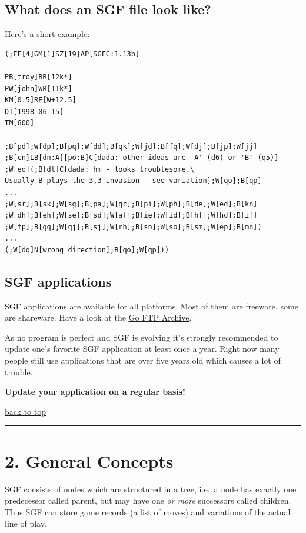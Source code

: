 \subsection{What does an SGF file look
like?}\label{what-does-an-sgf-file-look-like}

Here's a short example:

\begin{verbatim}
(;FF[4]GM[1]SZ[19]AP[SGFC:1.13b]

PB[troy]BR[12k*]
PW[john]WR[11k*]
KM[0.5]RE[W+12.5]
DT[1998-06-15]
TM[600]

;B[pd];W[dp];B[pq];W[dd];B[qk];W[jd];B[fq];W[dj];B[jp];W[jj]
;B[cn]LB[dn:A][po:B]C[dada: other ideas are 'A' (d6) or 'B' (q5)]
;W[eo](;B[dl]C[dada: hm - looks troublesome.\
Usually B plays the 3,3 invasion - see variation];W[qo];B[qp]
...
;W[sr];B[sk];W[sg];B[pa];W[gc];B[pi];W[ph];B[de];W[ed];B[kn]
;W[dh];B[eh];W[se];B[sd];W[af];B[ie];W[id];B[hf];W[hd];B[if]
;W[fp];B[gq];W[qj];B[sj];W[rh];B[sn];W[so];B[sm];W[ep];B[mn])
...
(;W[dq]N[wrong direction];B[qo];W[qp]))
\end{verbatim}

\subsection{SGF applications}\label{sgf-applications}

SGF applications are available for all platforms. Most of them are
freeware, some are shareware. Have a look at the
\href{ftp://igs.nuri.net/Go/}{Go FTP Archive}.

As no program is perfect and SGF is evolving it's strongly recommended
to update one's favorite SGF application at least once a year. Right now
many people still use applications that are over five years old which
causes a lot of trouble.

\textbf{Update your application on a regular basis!}

\href{https://red-bean.com/sgf/user_guide/index.html\#toc}{back to top}

\begin{center}\rule{0.5\linewidth}{0.5pt}\end{center}

\section{2. General Concepts}\label{general-concepts}

SGF consists of nodes which are structured in a tree, i.e.~a node has
exactly one predecessor called parent, but may have one \emph{or more}
successors called children. Thus SGF can store game records (a list of
moves) and variations of the actual line of play.


